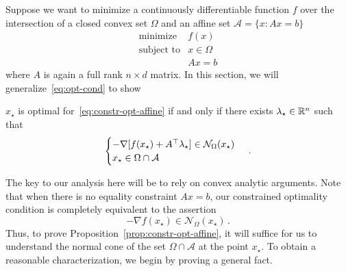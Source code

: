 

Suppose we want to minimize a continuously differentiable function $f$ over the intersection of a closed convex set $\Omega$ and an affine set $\mathcal{A} = \{x: Ax=b\}$\begin{equation} \label{eq:constr-opt-affine}
  \begin{array}{ll}
  \text{minimize} &f(x)\\
  \text{subject to} &x \in \Omega\\
  & Ax=b
  \end{array}
  \end{equation}
where $A$ is again a full rank $n\times d$ matrix.  In this section, we will generalize~\eqref{eq:opt-cond} to show

\begin{proposition}\label{prop:constr-opt-affine} $x_\star$ is optimal for~\eqref{eq:constr-opt-affine} if and only if there exists $\lambda_\star \in \mathbb{R}^n$ such that
\[
 \begin{cases}
 - \nabla [f(x_\star) + A^{\top} \lambda_\star] \in \mathcal{N}_{\Omega} (x_\star)\\
  x_\star \in \Omega \cap \mathcal{A}
  \end{cases}\,.
 \]
\end{proposition}
The key to our analysis here will be to rely on convex analytic arguments. Note that when there is no equality constraint $Ax = b$, our constrained optimality condition is completely equivalent to the assertion
\begin{equation}\label{eq:opt-cond-basic}
  - \nabla f(x_\star) \in \mathcal{N}_{\Omega}(x_\star)\,.
 \end{equation}
Thus, to prove Proposition~\ref{prop:constr-opt-affine}, it will suffice for us to understand the normal cone of the set $\Omega \cap \mathcal{A}$
at the point $x_\star$. To obtain a reasonable characterization, we begin by proving a general fact.
 
